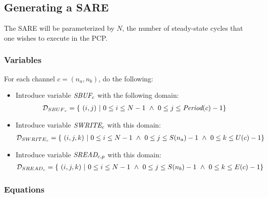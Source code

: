 \subsection{Generating a SARE}

The SARE will be parameterized by $N$, the number of steady-state
cycles that one wishes to execute in the PCP.

\subsubsection{Variables}

For each channel $c = (n_a, n_b)$, do the following:
\begin{itemize}

\item Introduce variable $\mbox{\it SBUF}_c$ with the following domain:
\begin{align*}
{\cal D}_{{SBUF}_c} = \{ ~(i,j)~|~0 \le i \le N - 1 ~\wedge~ 0 \le j \le \mbox{\it Period}(c) - 1\}
\end{align*}

\item Introduce variable $\mbox{\it SWRITE}_{c}$ with this domain:
\begin{align*}
{\cal D}_{{SWRITE}_{c}} = \{~(i,j,k)~|~0 \le i \le N-1 ~\wedge~ 
                                       0 \le j \le S(n_a) - 1 ~\wedge~ 0 \le k \le U(c) - 1\}
\end{align*}

\item Introduce variable $\mbox{\it SREAD}_{c, p}$ with this domain:
\begin{align*}
{\cal D}_{{SREAD}_{c}} = \{~(i,j,k)~|~0 \le i \le N-1 ~\wedge~ 
                                      0 \le j \le S(n_b) - 1 ~\wedge~ 
                                      0 \le k \le E(c) - 1\} \\
\end{align*}

\end{itemize}

\subsubsection{Equations}

